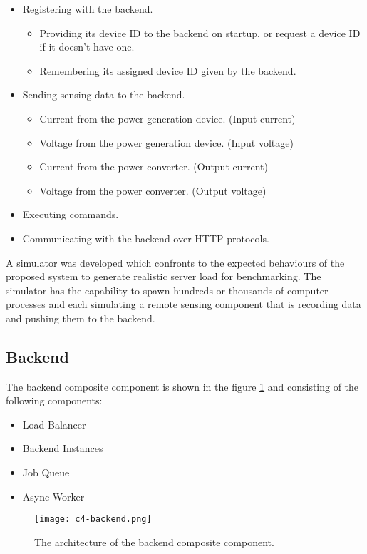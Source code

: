 \documentclass[../thesis.tex]{subfiles}
\begin{document}
\begin{itemize}
	\item Registering with the backend.
	\begin{itemize}
		\item Providing its device ID to the backend on startup, or request a device ID if it doesn't have one. 
		\item Remembering its assigned device ID given by the backend. 
	\end{itemize}
	\item Sending sensing data to the backend.
	\begin{itemize}
		\item Current from the power generation device. (Input current)
		\item Voltage from the power generation device. (Input voltage)
		\item Current from the power converter. (Output current)
		\item Voltage from the power converter. (Output voltage)
	\end{itemize}
	\item Executing commands.
	\item Communicating with the backend over HTTP protocols.
\end{itemize}

A simulator was developed which confronts to the expected behaviours of the proposed system to generate realistic server load for benchmarking. The simulator has the capability to spawn hundreds or thousands of computer processes and each simulating a remote sensing component that is recording data and pushing them to the backend.


\subsection{Backend}
\label{sec:backend}

The backend composite component is shown in the figure \ref{fig:backend} and consisting of the following components:
\begin{itemize}
	\item Load Balancer
	\item Backend Instances
	\item Job Queue
	\item Async Worker
\end{itemize}


\begin{figure}[!ht]
	\centering
	\texttt{[image: c4-backend.png]}
	\caption{The architecture of the backend composite component.}
	\label{fig:backend}
\end{figure}
\end{document}
